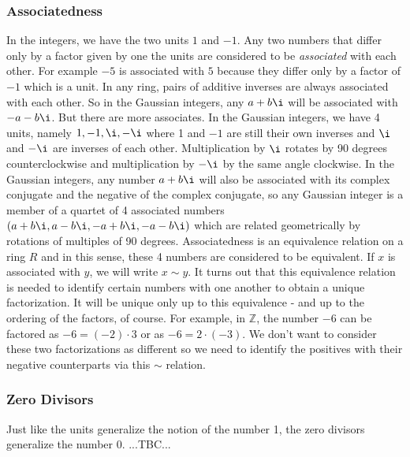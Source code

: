 


\subsubsection{Associatedness}
In the integers, we have the two units $1$ and $-1$. Any two numbers that differ only by a factor given by one the units are considered to be \emph{associated} with each other. For example $-5$ is associated with $5$ because they differ only by a factor of $-1$ which is a unit. In any ring, pairs of additive inverses are always associated with each other. So in the Gaussian integers, any $a + b \i$ will be associated with $-a - b \i$. But there are more associates. In the Gaussian integers, we have 4 units, namely $1,-1,\i,-\i$ where 1 and $-1$ are still their own inverses and $\i$ and $-\i$ are inverses of each other. Multiplication by $\i$ rotates by 90 degrees counterclockwise and multiplication by $-\i$ by the same angle clockwise. In the Gaussian integers, any number $a + b \i$ will also be associated with its complex conjugate and the negative of the complex conjugate, so any Gaussian integer is a member of a quartet of 4 associated numbers $(a + b\i, a - b \i, -a + b \i, -a - b \i)$ which are related geometrically by rotations of multiples of 90 degrees. Associatedness is an equivalence relation on a ring $R$ and in this sense, these 4 numbers are considered to be equivalent. If $x$ is associated with $y$, we will write $x \sim y$. 
It turns out that this equivalence relation is needed to identify certain numbers with one another to obtain a unique factorization. It will be unique only up to this equivalence - and up to the ordering of the factors, of course. For example, in $\mathbb{Z}$, the number $-6$ can be factored as $-6 = (-2) \cdot 3$ or as $-6 = 2 \cdot (-3)$. We don't want to consider these two factorizations as different so we need to identify the positives with their negative counterparts via this $\sim$ relation.



\subsubsection{Zero Divisors}
Just like the units generalize the notion of the number 1, the zero divisors generalize the number 0. ...TBC...


